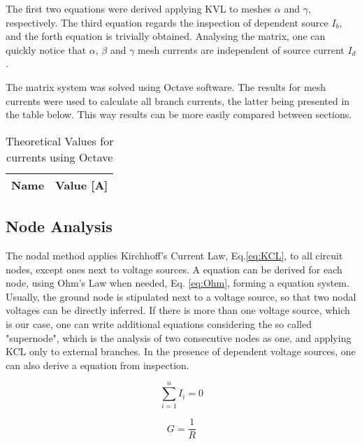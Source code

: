 \par The first two equations were derived applying KVL to meshes $\alpha$ and $\gamma$, respectively. The third equation regards the inspection of dependent source $I_b$, and the forth equation is trivially obtained.
Analysing the matrix, one can quickly notice that $\alpha$, $\beta$ and $\gamma$ mesh currents are independent of source current $I_d$.

\par The matrix system was solved using Octave software. The results for mesh currents were used to calculate all branch currents, the latter being presented in the table below. This way results can be more easily compared between sections.



\begin{table}[H]
  \centering
  \begin{tabular}{|l|r|}
    \hline
    {\bf Name} & {\bf Value [A]} \\ \hline
  \end{tabular}
  \caption{Theoretical Values for currents using Octave}
  \label{tab:TCurrents}
\end{table}

\subsection{Node Analysis}
\par The nodal method applies Kirchhoff's Current Law, Eq.\ref{eq:KCL}, to all circuit nodes, except ones next to voltage sources. A equation can be derived for each node, using Ohm's Law when needed, Eq. \ref{eq:Ohm}, forming a equation system. Usually, the ground node is stipulated next to a voltage source, so that two nodal voltages can be directly inferred. If there is more than one voltage source, which is our case, one can write additional equations considering the so called "supernode", which is the analysis of two consecutive nodes as one, and applying KCL only to external branches. In the presence of dependent voltage sources, one can also derive a equation from inspection.
\begin{multicols}{2}
\begin{equation}
    \sum_{i=1}^{n} I_i = 0
    \label{eq:KCL}
\end{equation}

\begin{equation}
    G = \frac{1}{R}
    \label{eq:G}
\end{equation}
\end{multicols}

